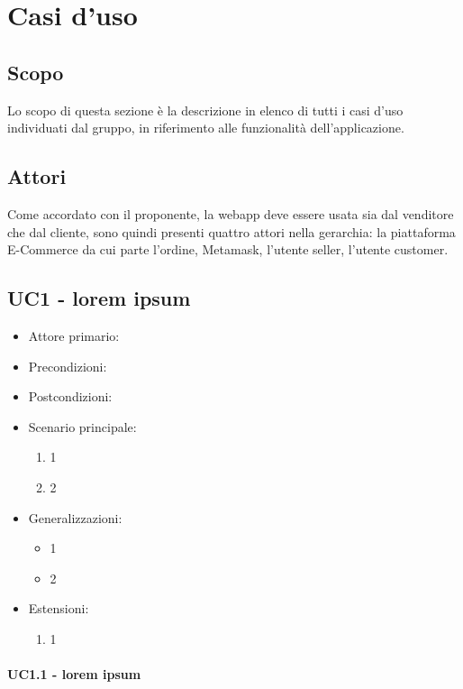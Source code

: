 \section{Casi d'uso}

\subsection{Scopo}
Lo scopo di questa sezione è la descrizione in elenco di tutti i casi d’uso individuati dal gruppo, in
riferimento alle funzionalità dell’applicazione.

\subsection{Attori}
Come accordato con il proponente, la webapp deve essere usata sia dal venditore che dal cliente,
sono quindi presenti quattro attori nella gerarchia: la piattaforma E-Commerce da cui parte l'ordine, Metamask, l'utente seller, l'utente customer.

\subsection{UC1 - lorem ipsum}

\begin{itemize}
    \item Attore primario:
    \item Precondizioni:
    \item Postcondizioni:
    \item Scenario principale: \begin{enumerate}
        \item 1
        \item 2
    \end{enumerate}
    \item Generalizzazioni: \begin{itemize}
        \item 1
        \item 2
    \end{itemize}
    \item Estensioni: \begin{enumerate}
        \item 1
    \end{enumerate}
\end{itemize}

\paragraph{UC1.1 - lorem ipsum}

